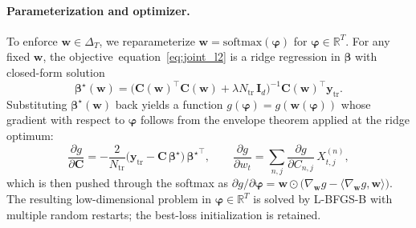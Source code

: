 \documentclass{article}
\def\eqref#1{equation~\ref{#1}}
\def\vw{{\bm{w}}}
\def\vy{{\bm{y}}}
\def\vbeta{{\bm{\beta}}}
\def\mC{{\bm{C}}}
\def\mI{{\bm{I}}}
\def\sR{{\mathbb{R}}}
\newcommand{\softmax}{\mathrm{softmax}}
\renewcommand{\softmax}{\mathrm{softmax}}
\newcommand{\vphi}{\bm{\varphi}}
\begin{document}
\paragraph{Parameterization and optimizer.}
To enforce $\vw\in\Delta_T$, we reparameterize $\vw = \softmax(\vphi)$ for
$\vphi\in\sR^T$. For any fixed $\vw$, the objective~\eqref{eq:joint_l2} is
a ridge regression in $\vbeta$ with closed-form solution
\[
    \vbeta^\star(\vw)
    = \bigl(\mC(\vw)^\top\mC(\vw) + \lambda N_\mathrm{tr}\,\mI_d\bigr)^{-1}
      \mC(\vw)^\top \vy_\mathrm{tr}.
\]
Substituting $\vbeta^\star(\vw)$ back yields a function
$g(\vphi) = g(\vw(\vphi))$ whose gradient with respect to $\vphi$ follows
from the envelope theorem applied at the ridge optimum:
\[
    \frac{\partial g}{\partial \mC}
    = -\frac{2}{N_\mathrm{tr}}\bigl(\vy_\mathrm{tr}
        - \mC\,\vbeta^\star\bigr)\,{\vbeta^\star}^\top,
    \qquad
    \frac{\partial g}{\partial w_t}
    = \sum_{n,j}
      \frac{\partial g}{\partial C_{n,j}}\, X_{t,j}^{(n)},
\]
which is then pushed through the softmax as
$\partial g/\partial \vphi = \vw\odot\bigl(\nabla_{\vw}g
- \langle \nabla_{\vw}g,\vw\rangle\bigr)$. The resulting
low-dimensional problem in $\vphi\in\sR^{T}$ is solved by L-BFGS-B with
multiple random restarts; the best-loss initialization is retained.
\end{document}
